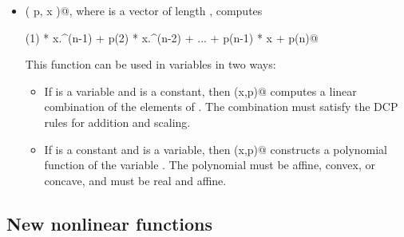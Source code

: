\documentclass[12pt]{article}
\begin{document}
\begin{itemize}
\item \verb@polyval( p, x )@, where \verb@p@ is a vector of length
\verb@n@, computes
\begin{center}
	\verb@p(1) * x.^(n-1) + p(2) * x.^(n-2) + ... + p(n-1) * x + p(n)@
\end{center}
This function can be used in \cvx variables in two ways:
\begin{itemize}
\item If \verb@p@ is a variable and \verb@x@ is a constant, then \verb@polyval(x,p)@
	  computes a linear combination of the elements of \verb@p@. The combination
	  must satisfy the DCP rules for addition and scaling.
\item If \verb@p@ is a constant and \verb@x@ is a variable, then \verb@polyval(x,p)@
      constructs a polynomial function of the variable \verb@x@. The 
      polynomial must be affine, convex, or concave, and 
       \verb@x@ must be real and affine.
\end{itemize}
\end{itemize}

\subsection{New nonlinear functions}
\end{document}
